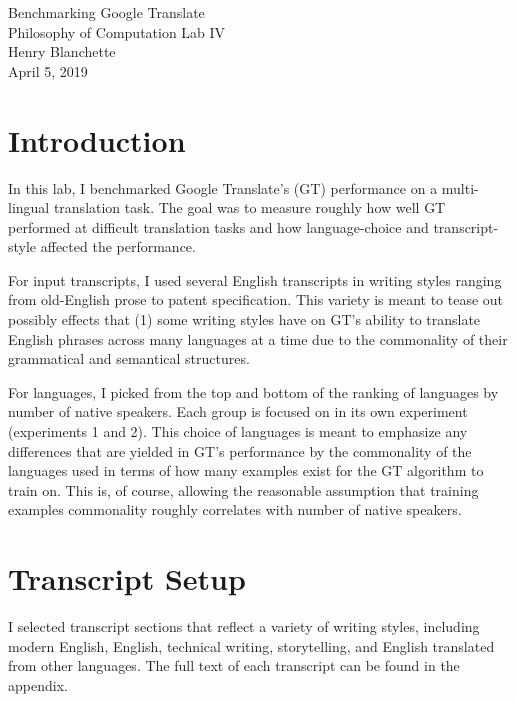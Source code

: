 \documentclass{article}
\begin{document}
\begin{center}{\huge   Benchmarking Google Translate }\\[0.4cm]{\large  Philosophy of Computation Lab IV }\\[0.75cm]{\large  Henry Blanchette }\\[0.5cm]{\large  April 5, 2019 }\\[1.0cm]\end{center} \section{Introduction}


In this lab, I benchmarked Google Translate's (GT) performance on a multi-lingual translation task.
The goal was to measure roughly how well GT performed at difficult translation tasks and how language-choice and transcript-style affected the performance.




For input transcripts, I used several English transcripts in writing styles ranging from old-English prose to patent specification.
This variety is meant to tease out possibly effects that (1) some writing styles have on GT's ability to translate English phrases across many languages at a time due to the commonality of their grammatical and semantical structures.





For languages, I picked from the top and bottom of the ranking of languages by number of native speakers.
Each group is focused on in its own experiment (experiments 1 and 2).
This choice of languages is meant to emphasize any differences that are yielded in GT's performance by the commonality of the languages used in terms of how many examples exist for the GT algorithm to train on. This is, of course, allowing the reasonable assumption that training examples commonality roughly correlates with number of native speakers.


\section{Transcript Setup}


I selected transcript sections that reflect a variety of writing styles, including modern English, English, technical writing, storytelling, and English translated from other languages. The full text of each transcript can be found in the appendix.
\end{document}
